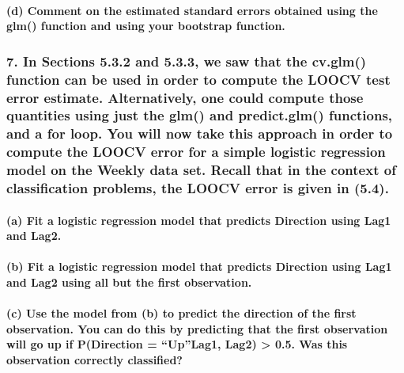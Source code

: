 \documentclass[
]{article}
\begin{document}
\paragraph{(d) Comment on the estimated standard errors obtained using
the glm() function and using your bootstrap
function.}\label{d-comment-on-the-estimated-standard-errors-obtained-using-the-glm-function-and-using-your-bootstrap-function.}

\subsubsection{7. In Sections 5.3.2 and 5.3.3, we saw that the cv.glm()
function can be used in order to compute the LOOCV test error estimate.
Alternatively, one could compute those quantities using just the glm()
and predict.glm() functions, and a for loop. You will now take this
approach in order to compute the LOOCV error for a simple logistic
regression model on the Weekly data set. Recall that in the context of
classification problems, the LOOCV error is given in
(5.4).}\label{in-sections-5.3.2-and-5.3.3-we-saw-that-the-cv.glm-function-can-be-used-in-order-to-compute-the-loocv-test-error-estimate.-alternatively-one-could-compute-those-quantities-using-just-the-glm-and-predict.glm-functions-and-a-for-loop.-you-will-now-take-this-approach-in-order-to-compute-the-loocv-error-for-a-simple-logistic-regression-model-on-the-weekly-data-set.-recall-that-in-the-context-of-classification-problems-the-loocv-error-is-given-in-5.4.}

\paragraph{(a) Fit a logistic regression model that predicts Direction
using Lag1 and
Lag2.}\label{a-fit-a-logistic-regression-model-that-predicts-direction-using-lag1-and-lag2.}

\paragraph{(b) Fit a logistic regression model that predicts Direction
using Lag1 and Lag2 using all but the first
observation.}\label{b-fit-a-logistic-regression-model-that-predicts-direction-using-lag1-and-lag2-using-all-but-the-first-observation.}

\paragraph{(c) Use the model from (b) to predict the direction of the
first observation. You can do this by predicting that the first
observation will go up if P(Direction = ``Up''\textbar Lag1, Lag2)
\textgreater{} 0.5. Was this observation correctly
classified?}\label{c-use-the-model-from-b-to-predict-the-direction-of-the-first-observation.-you-can-do-this-by-predicting-that-the-first-observation-will-go-up-if-pdirection-uplag1-lag2-0.5.-was-this-observation-correctly-classified}
\end{document}

